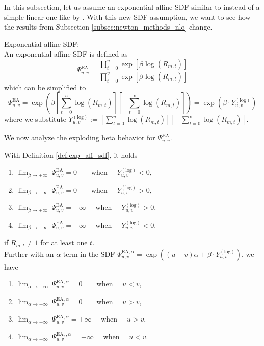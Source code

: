 In this subsection, let us assume an exponential affine SDF similar to \cite{KN16} instead of a simple linear one like by \cite{DLP12}.
With this new SDF assumption, we want to see how the results from Subsection \ref{subsec:newton_methods_nlo} change.

\begin{definition}
	\label{def:exp_aff_sdf}
	Exponential affine SDF: \\
	An exponential affine SDF is defined as
	\[
	\Psi_{u,v}^{\mathrm{EA}} =
	\frac{\prod_{t=0}^{u} \exp \left[ \beta \log \left( R_{m,t} \right) \right] }{\prod_{t=0}^{v} \exp \left[  \beta \log \left( R_{m,t} \right) \right]}
	\]
	which can be simplified to
	\[
	\Psi_{u,v}^{\mathrm{EA}} =
	\exp \left( \beta \left[ \sum_{t=0}^{u} \log \left( R_{m,t} \right) \right] \left[ -\sum_{t=0}^{v}  \log \left( R_{m,t} \right) \right] \right) = \exp \left( \beta \cdot Y_{u,v}^{(\mathrm{log})} \right)
	\]
	where we substitute $Y_{u,v}^{(\mathrm{log})} := \left[ \sum_{t=0}^{u} \log \left( R_{m,t} \right) \right] \left[ -\sum_{t=0}^{v}  \log \left( R_{m,t} \right) \right]$.
\end{definition}


We now analyze the exploding beta behavior for $\Psi_{u,v}^{\mathrm{EA}}$.

\begin{lemma}
	\label{lem:limit_exp_aff_sdf}
	With Definition \ref{def:exp_aff_sdf}, it holds
	\begin{enumerate}
		\item $	\lim_{\beta \to + \infty} \ \Psi_{u, v}^{\mathrm{EA}}  = 0 \quad \ \ \ $ when $ \quad Y_{u,v}^{(\mathrm{log})} < 0$,
		\item $	\lim_{\beta \to - \infty} \ \Psi_{u, v}^{\mathrm{EA}}  = 0 \quad \ \ \ $ when $ \quad Y_{u,v}^{(\mathrm{log})} > 0$,
		\item $	\lim_{\beta \to + \infty} \ \Psi_{u, v}^{\mathrm{EA}} = + \infty \quad$ when $ \quad Y_{u,v}^{(\mathrm{log})} > 0$,
		\item $	\lim_{\beta \to - \infty} \ \Psi_{u, v}^{\mathrm{EA}} = + \infty \quad$ when $ \quad Y_{u,v}^{(\mathrm{log})} < 0$.
	\end{enumerate}
	if $R_{m,t} \neq 1$ for at least one $t$. \\
	Further with an $\alpha$ term in the SDF $\Psi_{u,v}^{\mathrm{EA}, \alpha} = \exp \left( (u-v) \alpha + \beta \cdot Y_{u,v}^{(\mathrm{log})} \right)$, we have
	\begin{enumerate}
		\item $	\lim_{\alpha \to + \infty} \ \Psi_{u,v}^{\mathrm{EA}, \alpha}  = 0 \quad \ \ \ $ when $ \quad u < v$,
		\item $	\lim_{\alpha \to - \infty} \ \Psi_{u, v}^{\mathrm{EA}, \alpha}  = 0 \quad \ \ \ $ when $ \quad u > v$,
		\item $	\lim_{\alpha \to + \infty} \ \Psi_{u,v}^{\mathrm{EA}, \alpha}  = + \infty \quad $ when $ \quad u > v$,
		\item $	\lim_{\alpha \to - \infty} \ \Psi_{u, v}^{\mathrm{EA}, , \alpha}  = + \infty \quad $ when $ \quad u < v$.
	\end{enumerate}
\end{lemma}

